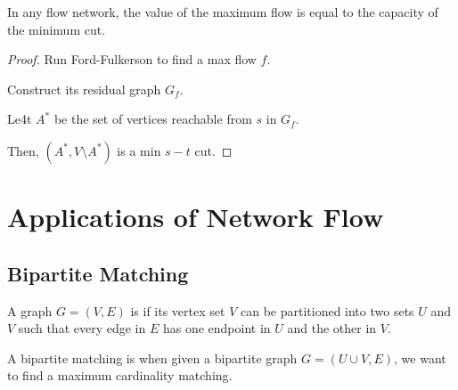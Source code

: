 \begin{theorem}
    In any flow network, the value of the maximum flow is equal to the capacity of the minimum cut.
\end{theorem}

\begin{proof}
    Run Ford-Fulkerson to find a max flow $f$. 

    Construct its residual graph $G_f$. 

    Le4t $A^*$ be the set of vertices reachable from $s$ in $G_f$.

    Then, $(A^*, V \setminus A^*)$ is a min $s-t$ cut.
\end{proof}

\section{Applications of Network Flow}

\subsection{Bipartite Matching}

\begin{definition}\label{def:bipartite-graph}
    A graph $G = (V, E)$ is  if its vertex set $V$ can be partitioned into two sets $U$ and $V$ such that every edge in $E$ has one endpoint in $U$ and the other in $V$.
\end{definition}

A bipartite matching is when given a bipartite graph $G = (U \cup V, E)$, we want to find a maximum cardinality matching.

